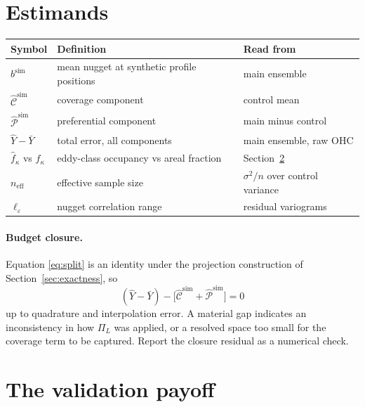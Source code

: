 \documentclass[11pt]{article}
\begin{document}
\section{Estimands}

\begin{table}[h]
\centering
\begin{tabular}{lll}
\toprule
Symbol & Definition & Read from \\
\midrule
$b^{\text{sim}}$ & mean nugget at synthetic profile positions & main ensemble \\
$\widehat{\mathcal{C}}^{\text{sim}}$ & coverage component & control mean \\
$\widehat{\mathcal{P}}^{\text{sim}}$ & preferential component & main minus control \\
$\hat{Y} - \bar{Y}$ & total error, all components & main ensemble, raw OHC \\
$\hat{f}_\kappa$ vs $f_\kappa$ & eddy-class occupancy vs areal fraction & Section~\ref{sec:validation} \\
$n_{\text{eff}}$ & effective sample size & $\sigma^2/n$ over control variance \\
$\ell_\varepsilon$ & nugget correlation range & residual variograms \\
\bottomrule
\end{tabular}
\end{table}

\paragraph{Budget closure.} Equation \eqref{eq:split} is an identity under the projection
construction of Section~\ref{sec:exactness}, so
\[
  (\hat{Y} - \bar{Y}) - \big[\widehat{\mathcal{C}}^{\text{sim}} + \widehat{\mathcal{P}}^{\text{sim}}\big] = 0
\]
up to quadrature and interpolation error. A material gap indicates an inconsistency in how
$\Pi_L$ was applied, or a resolved space too small for the coverage term to be captured. Report
the closure residual as a numerical check.

\section{The validation payoff}
\label{sec:validation}
\end{document}
